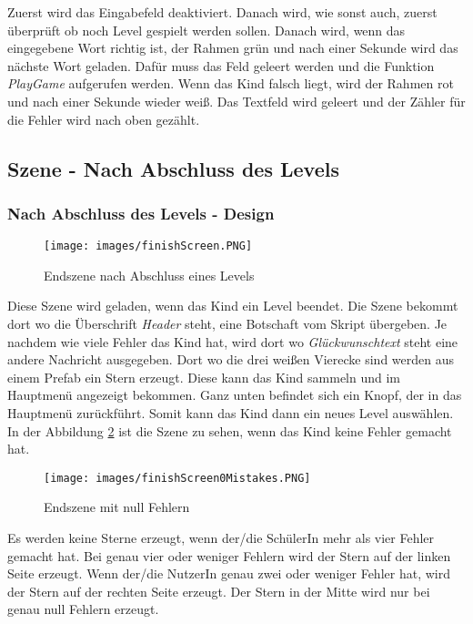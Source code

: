 Zuerst wird das Eingabefeld deaktiviert. Danach wird, wie sonst auch, zuerst überprüft ob noch Level gespielt werden sollen. Danach wird, wenn das eingegebene Wort richtig ist, der Rahmen grün und nach einer Sekunde wird das nächste Wort geladen. Dafür muss das Feld geleert werden und die Funktion \textit{PlayGame} aufgerufen werden. Wenn das Kind falsch liegt, wird der Rahmen rot und nach einer Sekunde wieder weiß. Das Textfeld wird geleert und der Zähler für die Fehler wird nach oben gezählt.
\subsection{Szene - Nach Abschluss des Levels}
\subsubsection{Nach Abschluss des Levels - Design}
\begin{figure}[htbp]
  \centering
  \texttt{[image: images/finishScreen.PNG]}
  \caption{Endszene nach Abschluss eines Levels}
  \label{finishSzene}
\end{figure}
Diese Szene wird geladen, wenn das Kind ein Level beendet. Die Szene bekommt dort wo die Überschrift \textit{Header} steht, eine Botschaft vom Skript übergeben. Je nachdem wie viele Fehler das Kind hat, wird dort wo \textit{Glückwunschtext} steht eine andere Nachricht ausgegeben. Dort wo die drei weißen Vierecke sind werden aus einem Prefab ein Stern erzeugt. Diese kann das Kind sammeln und im Hauptmenü angezeigt bekommen. Ganz unten befindet sich ein Knopf, der in das Hauptmenü zurückführt. Somit kann das Kind dann ein neues Level auswählen. In der Abbildung \ref{withoutError} ist die Szene zu sehen, wenn das Kind keine Fehler gemacht hat.
\begin{figure}[htbp]
  \centering
  \texttt{[image: images/finishScreen0Mistakes.PNG]}
  \caption{Endszene mit null Fehlern}
  \label{withoutError}
\end{figure}
Es werden keine Sterne erzeugt, wenn der/die SchülerIn mehr als vier Fehler gemacht hat. Bei genau vier oder weniger Fehlern wird der Stern auf der linken Seite erzeugt. Wenn der/die NutzerIn genau zwei oder weniger Fehler hat, wird der Stern auf der rechten Seite erzeugt. Der Stern in der Mitte wird nur bei genau null Fehlern erzeugt.
